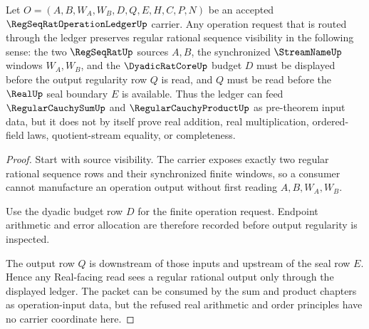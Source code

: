 \begin{theorem}
\label{thm:regseqrat-operation-ledger-regularity-preservation}
Let $O=(A,B,W_A,W_B,D,Q,E,H,C,P,N)$ be an accepted $\RegSeqRatOperationLedgerUp$ carrier. Any operation request that is routed through the ledger preserves regular rational sequence visibility in the following sense: the two $\RegSeqRatUp$ sources $A,B$, the synchronized $\StreamNameUp$ windows $W_A,W_B$, and the $\DyadicRatCoreUp$ budget $D$ must be displayed before the output regularity row $Q$ is read, and $Q$ must be read before the $\RealUp$ seal boundary $E$ is available. Thus the ledger can feed $\RegularCauchySumUp$ and $\RegularCauchyProductUp$ as pre-theorem input data, but it does not by itself prove real addition, real multiplication, ordered-field laws, quotient-stream equality, or completeness.
\end{theorem}
\begin{proof}
Start with source visibility. The carrier exposes exactly two regular rational sequence rows and their synchronized finite windows, so a consumer cannot manufacture an operation output without first reading $A,B,W_A,W_B$.

Use the dyadic budget row $D$ for the finite operation request. Endpoint arithmetic and error allocation are therefore recorded before output regularity is inspected.

The output row $Q$ is downstream of those inputs and upstream of the seal row $E$. Hence any Real-facing read sees a regular rational output only through the displayed ledger. The packet can be consumed by the sum and product chapters as operation-input data, but the refused real arithmetic and order principles have no carrier coordinate here.
\end{proof}



